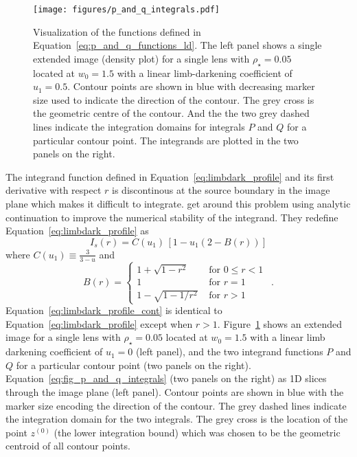\documentclass[12pt,dvipsnames]{report}
\newcommand{\hquad}{~~}
\begin{document}
\begin{figure}[t]
    \begin{centering}
        \texttt{[image: figures/p\_and\_q\_integrals.pdf]}
        \caption{Visualization of the functions defined in Equation~\ref{eq:p_and_q_functions_ld}.
        The left panel shows a single extended image (density plot) for a single lens with $\rho_\star=0.05$ 
        located at $w_0=1.5$ with a linear limb-darkening coefficient of $u_1=0.5$. Contour points
        are shown in blue with decreasing marker size used to indicate the direction of the 
        contour. The grey cross is the geometric centre of the contour. And the the two grey 
        dashed lines indicate the integration domains for integrals $P$ and $Q$ for a particular
        contour point. The integrands are plotted in the two panels on the right.}
        \label{fig:p_and_q_integrals}
    \end{centering}
\end{figure}


The integrand function defined in Equation~\ref{eq:limbdark_profile} and 
its first derivative with respect $r$ is discontinous at the source boundary in the image plane
 which makes it difficult to integrate.
\citet{1998A&A...333L..79D,2007MNRAS.377.1679D} get around this problem using analytic continuation to improve
the numerical stability of the integrand. They redefine Equation~\ref{eq:limbdark_profile} as 
\begin{equation}
    I_s(r)=C(u_1)\,\left[1-u_1\left(2-B(r)\right)\right]
\end{equation}
where $C(u_1)\equiv\frac{3}{3-u}$  and
\begin{equation}
B(r)= 
\begin{cases}
    1+\sqrt{1-r^{2}} & \text { for } 0 \leq r<1 \\
     1 & \text { for } r=1 \\
      1-\sqrt{1-1 / r^{2}} & \text { for } r>1
    \end{cases}
    \hquad .
    \label{eq:limbdark_profile_cont}
\end{equation}
Equation~\ref{eq:limbdark_profile_cont} is identical to Equation~\ref{eq:limbdark_profile} 
except when $r>1$. 
Figure~\ref{fig:p_and_q_integrals} shows an extended image for a single lens with 
$\rho_\star=0.05$ located at $w_0=1.5$ with a linear limb darkening coefficient of $u_1=0$ 
(left panel), and the two integrand functions $P$ and $Q$ for a particular contour point 
(two panels on the right). 
Equation~\ref{eq:fig_p_and_q_integrals} (two panels on the right) as 1D slices through the 
image plane (left panel). Contour points are shown in blue with the marker size encoding 
the direction of the contour. The grey dashed lines indicate the integration domain for the 
two integrals. The grey cross is the location of the point $z^{(0)}$ (the lower integration
bound) which was chosen to be the geometric centroid of all contour points. 
\end{document}
